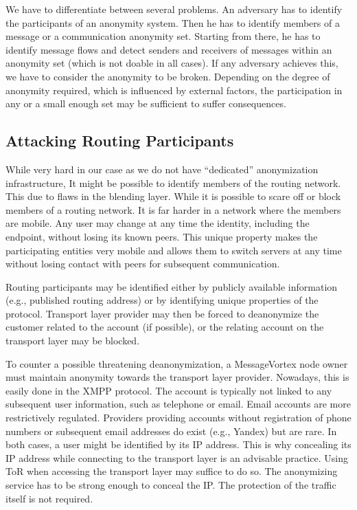 We have to differentiate between several problems. An adversary has to identify the participants of an anonymity system. Then he has to identify members of a message or a communication anonymity set. Starting from there, he has to identify message flows and detect senders and receivers of messages within an anonymity set (which is not doable in all cases). If any adversary achieves this, we have to consider the anonymity to be broken. Depending on the degree of anonymity required, which is influenced by external factors, the participation in any or a small enough set may be sufficient to suffer consequences.

\subsection{Attacking Routing Participants}
While very hard in our case as we do not have ``dedicated'' anonymization infrastructure, It might be possible to identify members of the routing network. This due to flaws in the blending layer. While it is possible to scare off or block members of a routing network. It is far harder in a network where the members are mobile. Any user may change at any time the identity, including the endpoint, without losing its known peers. This unique property makes the participating entities very mobile and allows them to switch servers at any time without losing contact with peers for subsequent communication.

Routing participants may be identified either by publicly available information (e.g., published routing address) or by identifying unique properties of the protocol. Transport layer provider may then be forced to deanonymize the customer related to the account (if possible), or the relating account on the transport layer may be blocked. 

To counter a possible threatening deanonymization, a MessageVortex node owner must maintain anonymity towards the transport layer provider. Nowadays, this is easily done in the XMPP protocol. The account is typically not linked to any subsequent user information, such as telephone or email. Email accounts are more restrictively regulated. Providers providing accounts without registration of phone numbers or subsequent email addresses do exist (e.g., Yandex) but are rare. In both cases, a user might be identified by its IP address. This is why concealing its IP address while connecting to the transport layer is an advisable practice. Using ToR when accessing the transport layer may suffice to do so. The anonymizing service has to be strong enough to conceal the IP. The protection of the traffic itself is not required.

